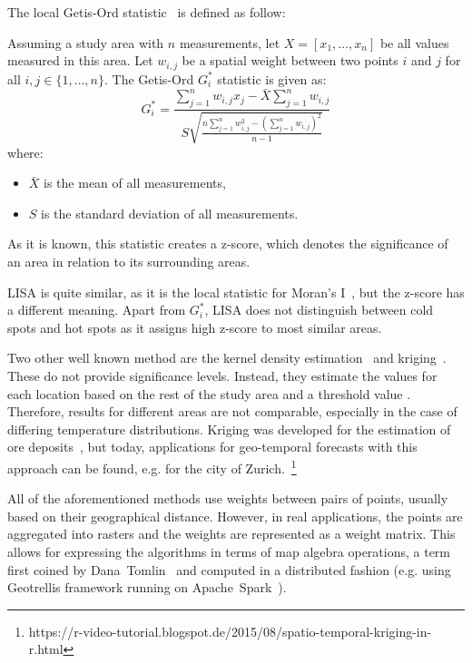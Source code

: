 \documentclass{itatnew}
\begin{document}
The local Getis-Ord statistic~\cite{Ord.1995} is defined as follow:
\begin{definition} \label{def:Gstar}
  Assuming a study area with $n$ measurements, let $X = [x_1, \ldots,
  x_n]$ be all values measured in this area. Let $w_{i,j}$ be a spatial weight
  between two points $i$ and $j$ for all $i,j \in \{ 1, \ldots, n\}$. The 
  Getis-Ord $G^*_i$ statistic is given as:
  \begin{equation} \label{eq:Gstar}
  G^*_i = \frac{
    \sum_{j=1}^{n}w_{i,j}x_j - \bar{X}\sum_{j=1}^{n}w_{i,j}
  }{
  S \sqrt{
    \frac{
      n \sum_{j=1}^{n}w_{i,j}^2 - (\sum_{j=1}^{n}w_{i,j})^2
    }{n-1}
  }
}
\end{equation}
where:
\begin{itemize}
  \item $\bar{X}$ is the mean of all measurements,
  \item $S$ is the standard deviation of all measurements.
\end{itemize}
\end{definition}

As it is known, this statistic creates a z-score, which denotes the significance
of an area in relation to its surrounding areas.

LISA is quite similar, as it is the local statistic for Moran's
I~\cite{Anselin.1995}, but the z-score has a different meaning. Apart from
$G^*_i$, LISA does not distinguish between cold spots and hot spots as it
assigns high z-score to most similar areas.

Two other well known method are the kernel density estimation~\cite{KDE_Hotspot}
and kriging~\cite{Kriging_Hotspot}. These do not provide significance levels.
Instead, they estimate the values for each location based on the rest of the
study area and a threshold value \cite{Thakali2015}. Therefore, results for
different areas are not comparable, especially in the case of differing
temperature distributions. Kriging was developed for the estimation of ore
deposits~\cite{krige1951statistical}, but today, applications for geo-temporal
forecasts with this approach can be found, e.g. for the city of
Zurich.~\footnote{https://r-video-tutorial.blogspot.de/2015/08/spatio-temporal-kriging-in-r.html}

All of the aforementioned methods use weights between pairs of points, usually
based on their geographical distance. However, in real applications, the points
are aggregated into rasters and the weights are represented as a weight matrix.
This allows for expressing the algorithms in terms of map algebra operations, a
term first coined by Dana~Tomlin~\cite{Tomlin1990} and computed in a distributed
fashion (e.g. using Geotrellis framework running on
Apache~Spark~\cite{github:Geotrellis}).
\end{document}

